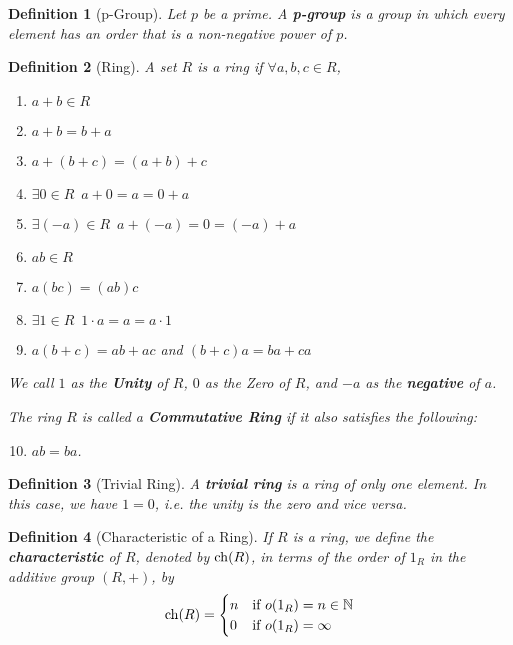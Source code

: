 \documentclass[9pt,landscape,a4paper]{article}
\newcommand{\hldefn}[1]{\textcolor{base16-eighties-magenta}{\textbf{#1}}}
\newcommand{\hlnoteb}[1]{\textcolor{base16-eighties-magenta}{\textbf{#1}}}
\theoremstyle{empty}
\newtheorem{defn}{Definition}
\begin{document}
\begin{multicols*}{5}
\begin{defn}[p-Group]
\label{defn:p_group}
  Let $p$ be a prime. A \hlnoteb{p-group} is a group in which every element has an order that is a non-negative power of $p$.
\end{defn}

\begin{defn}[Ring]
\label{defn:ring}
  A set $R$ is a ring if $\forall a, b, c \in R$,
  \begin{enumerate}
    \item $a + b \in R$
    \item $a + b = b + a$
    \item $a + (b + c) = (a + b) + c$
    \item $\exists 0 \in R \enspace a + 0 = a = 0 + a$
    \item $\exists (-a) \in R \enspace a + (-a) = 0 = (-a) + a$
    \item $ab \in R$
    \item $a(bc) = (ab)c$
    \item $\exists 1 \in R \enspace 1 \cdot a = a = a \cdot 1$
    \item $a ( b + c ) = ab + ac$ and $(b + c) a = ba + ca$
  \end{enumerate}
  We call $1$ as the \hldefn{Unity} of $R$, $0$ as the \textcolor{base16-eighties-blue}{Zero} of $R$, and $-a$ as the \hlnoteb{negative} of $a$.

  The ring $R$ is called a \hldefn{Commutative Ring} if it also satisfies the following:
  \begin{enumerate}
    \setcounter{enumi}{9}
    \item $ab = ba$.
  \end{enumerate}
\end{defn}

\begin{defn}[Trivial Ring]
\label{defn:trivial_ring}
A \hlnoteb{trivial ring} is a ring of only one element. In this case, we have $1 = 0$, i.e. the unity is the zero and vice versa.
\end{defn}

\begin{defn}[Characteristic of a Ring]
\label{defn:characteristic_of_a_ring}
  If $R$ is a ring, we define the \hlnoteb{characteristic} of $R$, denoted by $\operatorname{ch}(R)$, in terms of the order of $1_R$ in the additive group $(R, +)$, by
  \begin{equation*}
    \operatorname{ch}(R) = \begin{cases}
      n & \text{if } o(1_R) = n \in \mathbb{N} \\
      0 & \text{if } o(1_R) = \infty
    \end{cases}
  \end{equation*}
\end{defn}


\end{multicols*}
\end{document}
